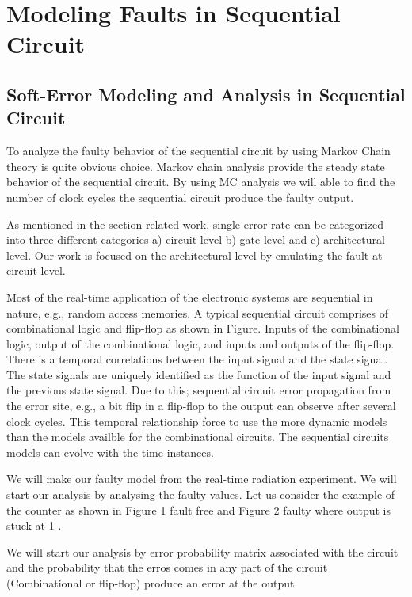 \section{Modeling Faults in Sequential Circuit}
\subsection{Soft-Error Modeling and Analysis in Sequential Circuit}


To analyze the faulty behavior of the sequential circuit by using Markov Chain theory is quite obvious choice. Markov chain analysis provide the steady state behavior of the sequential circuit. By using MC analysis we will able to find the number of clock cycles the sequential circuit produce the faulty output.

As mentioned in the section related work, single error rate can be categorized into three different categories a)  circuit level b) gate level and c) architectural level.  Our work is focused on the architectural level by emulating the fault at circuit level. 




Most of the real-time application of the electronic systems are sequential in nature, e.g., random access memories. A typical sequential circuit comprises of combinational logic and flip-flop as shown in Figure.   Inputs of the combinational logic, output of the combinational logic, and inputs and outputs of the flip-flop. There is a temporal correlations between the input signal and the state signal. The state signals are uniquely identified as the function of the input signal and the previous state signal. Due to this; sequential circuit error propagation from the error site, e.g., a bit flip in a flip-flop to the output can observe after several clock cycles. This temporal relationship force to use the more dynamic models than the models availble for the combinational circuits. The sequential circuits models can evolve with the time instances.

We will make our faulty model from the real-time radiation experiment. We will start our analysis by analysing the faulty values. Let us consider the example of the counter as shown in Figure 1 fault free and Figure 2 faulty where output is stuck at 1 .  


We will start our analysis by error probability matrix associated with the circuit and the probability that the erros comes in any part of the circuit (Combinational or flip-flop) produce an error at the output. 





